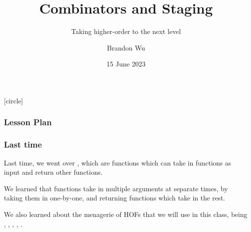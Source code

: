 \documentclass[aspectratio=169]{beamer}
\title{Combinators and Staging} %
\subtitle{Taking higher-order to the next level} %
\date{15 June 2023} %
\author{Brandon Wu} %
\newif\ifcolorlambda
\begin{document}
\ifweb
    \renewcommand{\pause}{}
\fi

[circle]

{
\begin{frame}[plain]
    \colorlambdatrue
    \titlepage
\end{frame}
}


\begin{frame}[fragile]
  \frametitle{Lesson Plan}

  \tableofcontents
\end{frame}


\begin{frame}[fragile]
  \frametitle{Last time}

  Last time, we went over , which are functions which
  can take in functions as input and return other functions.

  \pause
  \vspace{\fill}

  We learned that  functions take in multiple arguments at separate
  times, by taking them in one-by-one, and returning functions which take in the
  rest.

  \pause
  \vspace{\fill}

  We also learned about the menagerie of HOFs that we will use in this class, 
  being , , , , . 
\end{frame}

\end{document}
